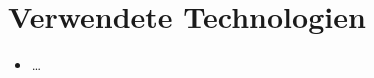 \section{Verwendete Technologien}



\begin{itemize}[leftmargin=*, nosep]
    \item \dots
\end{itemize}

